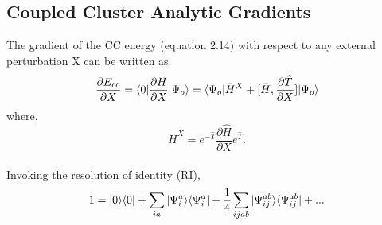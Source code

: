 \subsection{Coupled Cluster Analytic Gradients}
The gradient of the CC energy (equation 2.14) with respect to any external perturbation X 
can be written as:
\\
\begin{equation}
\frac{\partial{E_{cc}}}{\partial X} = \langle 0 |\frac{\partial{\bar H}}{\partial X}| \Psi_o \rangle = \langle \Psi_o |{\bar{H}}^X + \lbrack\bar H , \frac{\partial{\hat T}}{\partial X}\rbrack| \Psi_o \rangle 
\end{equation}
where, 
\begin{equation}
{\bar{H}}^X =  e^{-\hat{T}}\frac{\partial{\hat H}}{\partial X}e^{\hat{T}}.
\end{equation}
\\
Invoking the resolution of identity (RI),
\\
\begin{equation}
 1 = | 0 \rangle\langle 0 | + \sum_{ia}| {\Psi}^a_i \rangle\langle {\Psi}^a_i | + \frac{1}{4}\sum_{ijab}| {\Psi}^{ab}_{ij} \rangle\langle {\Psi}^{ab}_{ij} | + ...
\end{equation}
